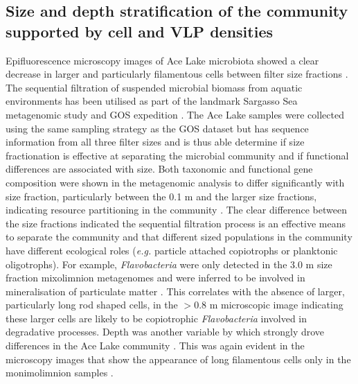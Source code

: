 \subsection[Community stratification supported by cell and \acs{VLP} densities]{Size and depth stratification of the community supported by cell and \acs{VLP} densities}

Epifluorescence microscopy images of Ace Lake microbiota showed a clear decrease in larger and particularly filamentous cells between filter size fractions .
The sequential filtration of suspended microbial biomass from aquatic environments has been utilised as part of the landmark Sargasso Sea metagenomic study \cite{Venter2004} and \ac{GOS} expedition \cite{Rusch2007}.
The Ace Lake samples were collected using the same sampling strategy as the \ac{GOS} dataset but has sequence information from all three filter sizes and is thus able determine if size fractionation is effective at separating the microbial community and if functional differences are associated with size.
Both taxonomic and functional gene composition were shown in the metagenomic analysis to differ significantly with size fraction, particularly between the 0.1 \textmu{}m and the larger size fractions, indicating resource partitioning in the community \cite{Lauro2011}.
The clear difference between the size fractions indicated the sequential filtration process is an effective means to separate the community and that different sized populations in the community have different ecological roles (\emph{e.g.} particle attached copiotrophs or planktonic oligotrophs).
For example, \emph{Flavobacteria} were only detected in the 3.0 \textmu{}m size fraction mixolimnion metagenomes and were inferred to be involved in mineralisation of particulate matter \cite{Lauro2011}.
This correlates with the absence of larger, particularly long rod shaped cells, in the $>$0.8 \textmu{}m microscopic image  indicating these larger cells are likely to be copiotrophic \emph{Flavobacteria} involved in degradative processes.
Depth was another variable by which strongly drove differences in the Ace Lake community \cite{Lauro2011}.
This was again evident in the microscopy images that show the appearance of long filamentous cells only in the monimolimnion samples .

